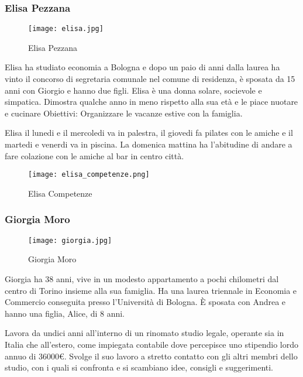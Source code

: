 \documentclass[12pt,italian,]{report}
\begin{document}
\hypertarget{elisa-pezzana-1}{%
\subsubsection{Elisa Pezzana}\label{elisa-pezzana-1}}

\begin{figure}
\centering
\texttt{[image: elisa.jpg]}
\caption{Elisa Pezzana}
\end{figure}

Elisa ha studiato economia a Bologna e dopo un paio di anni dalla laurea
ha vinto il concorso di segretaria comunale nel comune di residenza, è
sposata da 15 anni con Giorgio e hanno due figli. Elisa è una donna
solare, socievole e simpatica. Dimostra qualche anno in meno rispetto
alla sua età e le piace nuotare e cucinare Obiettivi: Organizzare le
vacanze estive con la famiglia.

Elisa il lunedi e il mercoledi va in palestra, il giovedi fa pilates con
le amiche e il martedi e venerdi va in piscina. La domenica mattina ha
l'abitudine di andare a fare colazione con le amiche al bar in centro
città.

\begin{figure}
\centering
\texttt{[image: elisa\_competenze.png]}
\caption{Elisa Competenze}
\end{figure}

\hypertarget{giorgia-moro-1}{%
\subsubsection{Giorgia Moro}\label{giorgia-moro-1}}

\begin{figure}
\centering
\texttt{[image: giorgia.jpg]}
\caption{Giorgia Moro}
\end{figure}

Giorgia ha 38 anni, vive in un modesto appartamento a pochi chilometri
dal centro di Torino insieme alla sua famiglia. Ha una laurea triennale
in Economia e Commercio conseguita presso l'Università di Bologna. È
sposata con Andrea e hanno una figlia, Alice, di 8 anni.

Lavora da undici anni all'interno di un rinomato studio legale, operante
sia in Italia che all'estero, come impiegata contabile dove percepisce
uno stipendio lordo annuo di 36000€. Svolge il suo lavoro a stretto
contatto con gli altri membri dello studio, con i quali si confronta e
si scambiano idee, consigli e suggerimenti.
\end{document}
